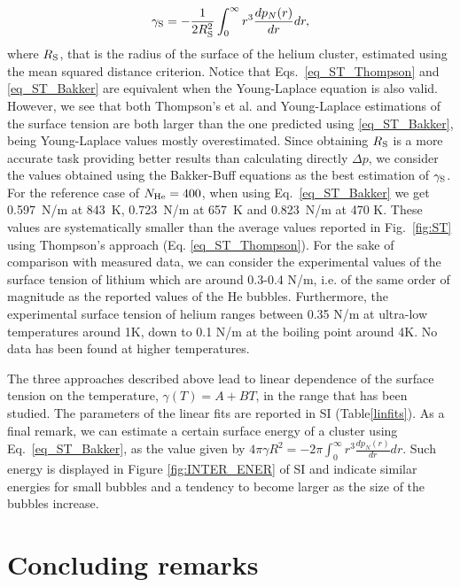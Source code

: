 \documentclass[jcp,amsmath,amssymb,preprint]{revtex4-1}
\begin{document}
\begin{equation}
    \gamma_{\rm S} = -\frac{1}{2 R_{\rm S}^2} \int_0^\infty r^3 \frac{dp_N(r)}{dr} dr,
    \label{eq_ST_Bakker}
\end{equation}
where $R_{\rm S}$, that is the radius of the surface of the helium cluster,  estimated using the mean squared distance criterion. Notice that Eqs.~\ref{eq_ST_Thompson} and \ref{eq_ST_Bakker} are equivalent when the Young-Laplace equation is also valid. However, we see that both Thompson's et al.  and Young-Laplace estimations of the surface tension are both larger than the one predicted using \ref{eq_ST_Bakker}, being Young-Laplace values mostly overestimated.  Since obtaining $R_{\rm S}$ is a more accurate task providing better results than calculating directly $\Delta p$, we consider the values obtained using the Bakker-Buff equations as the best estimation of $\gamma_{\rm S}$.  For the reference case of $N_{\rm He} = 400$, when using Eq.~\ref{eq_ST_Bakker} we get 0.597~N/m at 843~K, 0.723~N/m at 657~K and 0.823~N/m at 470 K.  These values are systematically smaller than the average values reported in Fig.~\ref{fig:ST} using Thompson's approach (Eq. \ref{eq_ST_Thompson}).  For the sake of comparison with measured data,  we can consider the experimental values of the surface tension of lithium\cite{davison1968compilation,zinkle1998summary} which are around 0.3-0.4 N/m, i.e. of the same order of magnitude as the reported values of the He bubbles.  Furthermore,  the experimental surface tension of helium ranges between 0.35 N/m at ultra-low temperatures around 1K,  down to 0.1 N/m at the boiling point around 4K\cite{wohlfarth2008surface}.  No data has been found at higher temperatures. 

The three approaches described above lead to linear dependence of the surface tension on the temperature, $ \gamma (T) = 
A + B T$, in the range that has been studied. The parameters of the linear fits are reported in SI (Table\ref{linfits}).  As a final remark,  we can estimate a certain surface energy of a cluster using Eq.~\ref{eq_ST_Bakker},  as the value given by 
$\displaystyle 4 \pi \gamma R^2 = -2\pi \int_0^\infty r^3 \frac{dp_N(r)}{dr} dr$.  Such energy is displayed in Figure \ref{fig:INTER_ENER} of SI and indicate similar energies for small bubbles and a tendency to become larger as the size of the bubbles increase.

 \section{Concluding remarks}
\label{concl}
\end{document}
